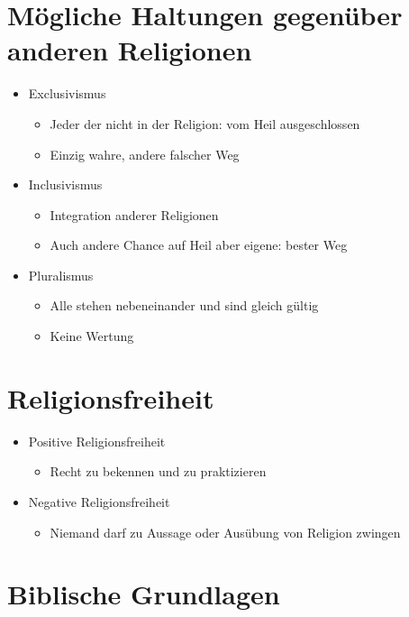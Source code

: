 \documentclass[11pt, paper=a4, twocolumn]{scrartcl}
\begin{document}
	\section{Mögliche Haltungen gegenüber anderen Religionen}

	\begin{itemize}
		\item Exclusivismus
			\begin{itemize}
				\item Jeder der nicht in der Religion: vom Heil ausgeschlossen
				\item Einzig wahre, andere falscher Weg
			\end{itemize}
		\item Inclusivismus
			\begin{itemize}
				\item Integration anderer Religionen
				\item Auch andere Chance auf Heil aber eigene: bester Weg
			\end{itemize}
		\item Pluralismus
			\begin{itemize}
				\item Alle stehen nebeneinander und sind gleich gültig
				\item Keine Wertung
			\end{itemize}
	\end{itemize}

	\section{Religionsfreiheit}

	\begin{itemize}
		\item Positive Religionsfreiheit
			\begin{itemize}
				\item Recht zu bekennen und zu praktizieren
			\end{itemize}
		\item Negative Religionsfreiheit
			\begin{itemize}
				\item Niemand darf zu Aussage oder Ausübung von Religion zwingen
			\end{itemize}
	\end{itemize}

	\section{Biblische Grundlagen}
\end{document}
